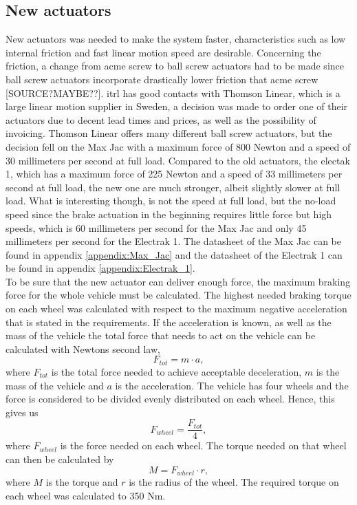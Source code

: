 \documentclass[a4paper,11pt]{kth-mag}
\begin{document}
\subsection{New actuators}
New actuators was needed to make the system faster, characteristics such as low internal friction and fast linear motion speed are desirable. Concerning the friction, a change from acme screw to ball screw actuators had to be made since ball screw actuators incorporate drastically lower friction that acme screw [SOURCE?MAYBE??]. \gls{itrl} has good contacts with Thomson Linear, which is a large linear motion supplier in Sweden, a decision was made to order one of their actuators due to decent lead times and prices, as well as the possibility of invoicing. Thomson Linear offers many different ball screw actuators, but the decision fell on the Max Jac with a maximum force of 800 Newton and a speed of 30 millimeters per second at full load. Compared to the old actuators, the electak 1, which has a maximum force of 225 Newton and a speed of 33 millimeters per second at full load, the new one are much stronger, albeit slightly slower at full load. What is interesting though, is not the speed at full load, but the no-load speed since the brake actuation in the beginning requires little force but high speeds, which is 60 millimeters per second for the Max Jac and only 45 millimeters per second for the Electrak 1. The datasheet of the Max Jac can be found in appendix \ref{appendix:Max_Jac} and the datasheet of the Electrak 1 can be found in appendix \ref{appendix:Electrak_1}.\\

To be sure that the new actuator can deliver enough force, the maximum braking force for the whole vehicle must be calculated. The highest needed braking torque on each wheel was calculated with respect to the maximum negative acceleration that is stated in the requirements. If the acceleration is known, as well as the mass of the vehicle the total force that needs to act on the vehicle can be calculated with Newtons second law, 
\begin{equation}
F_{tot}=m\cdot a,
\end{equation}
where $F_{tot}$ is the total force needed to achieve acceptable deceleration, $m$ is the mass of the vehicle and $a$ is the acceleration. The vehicle has four wheels and the force is considered to be divided evenly distributed on each wheel. Hence, this gives us 
\begin{equation}
F_{wheel}=\frac{F_{tot}}{4},
\end{equation}
where $F_{wheel}$ is the force needed on each wheel. The torque needed on that wheel can then be calculated by 
\begin{equation}
M=F_{wheel}\cdot r,
\end{equation}
where $M$ is the torque and $r$ is the radius of the wheel. The required torque on each wheel was calculated to 350 Nm.\\
\end{document}
